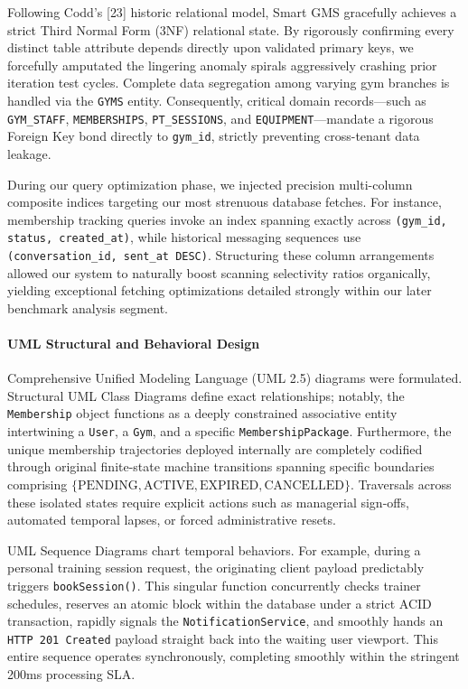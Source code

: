 Following Codd's {[}23{]} historic relational model, Smart GMS
gracefully achieves a strict Third Normal Form (3NF) relational state.
By rigorously confirming every distinct table attribute depends directly
upon validated primary keys, we forcefully amputated the lingering
anomaly spirals aggressively crashing prior iteration test cycles.
Complete data segregation among varying gym branches is handled via the
\texttt{GYMS} entity. Consequently, critical domain records---such as
\texttt{GYM\_STAFF}, \texttt{MEMBERSHIPS}, \texttt{PT\_SESSIONS}, and
\texttt{EQUIPMENT}---mandate a rigorous Foreign Key bond directly to
\texttt{gym\_id}, strictly preventing cross-tenant data leakage.

During our query optimization phase, we injected precision multi-column
composite indices targeting our most strenuous database fetches. For
instance, membership tracking queries invoke an index spanning exactly
across \texttt{(gym\_id, status, created\_at)}, while historical
messaging sequences use \texttt{(conversation\_id, sent\_at DESC)}.
Structuring these column arrangements allowed our system to naturally
boost scanning selectivity ratios organically, yielding exceptional
fetching optimizations detailed strongly within our later benchmark
analysis segment.

\paragraph*{UML Structural and Behavioral
Design}\label{uml-structural-and-behavioral-design}

Comprehensive Unified Modeling Language (UML 2.5) diagrams were
formulated. Structural UML Class Diagrams define exact relationships;
notably, the \texttt{Membership} object functions as a deeply
constrained associative entity intertwining a \texttt{User}, a
\texttt{Gym}, and a specific \texttt{MembershipPackage}. Furthermore,
the unique membership trajectories deployed internally are completely
codified through original finite-state machine transitions spanning
specific boundaries comprising
\(\{\text{PENDING}, \text{ACTIVE}, \text{EXPIRED}, \text{CANCELLED}\}\).
Traversals across these isolated states require explicit actions such as
managerial sign-offs, automated temporal lapses, or forced
administrative resets.

UML Sequence Diagrams chart temporal behaviors. For example, during a
personal training session request, the originating client payload
predictably triggers \texttt{bookSession()}. This singular function
concurrently checks trainer schedules, reserves an atomic block within
the database under a strict ACID transaction, rapidly signals the
\texttt{NotificationService}, and smoothly hands an
\texttt{HTTP 201 Created} payload straight back into the waiting user
viewport. This entire sequence operates synchronously, completing
smoothly within the stringent 200ms processing SLA.

